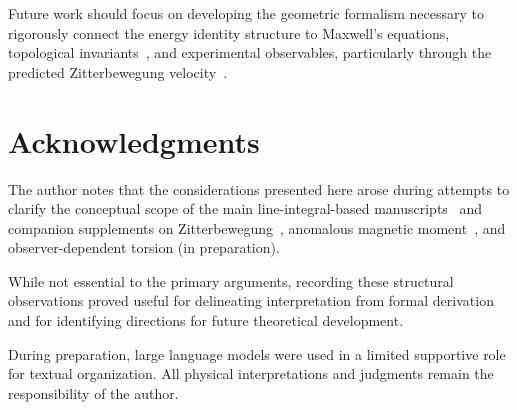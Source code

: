 \documentclass[12pt,letterpaper]{article}
\begin{document}
Future work should focus on developing the geometric formalism necessary to rigorously connect the energy identity structure to Maxwell's equations, topological invariants~\cite{Nakahara2003}, and experimental observables, particularly through the predicted Zitterbewegung velocity~\cite{hanamura18356895,hanamura17765409}.


\section*{Acknowledgments}

The author notes that the considerations presented here arose during attempts to clarify the conceptual scope of the main line-integral-based manuscripts~\cite{hanamura18067760,hanamura18135855,hanamura18203433} and companion supplements on Zitterbewegung~\cite{hanamura18356895}, anomalous magnetic moment~\cite{hanamura18511664}, and observer-dependent torsion (in preparation).

While not essential to the primary arguments, recording these structural observations proved useful for delineating interpretation from formal derivation and for identifying directions for future theoretical development.

During preparation, large language models were used in a limited supportive role for textual organization. All physical interpretations and judgments remain the responsibility of the author.
\end{document}
